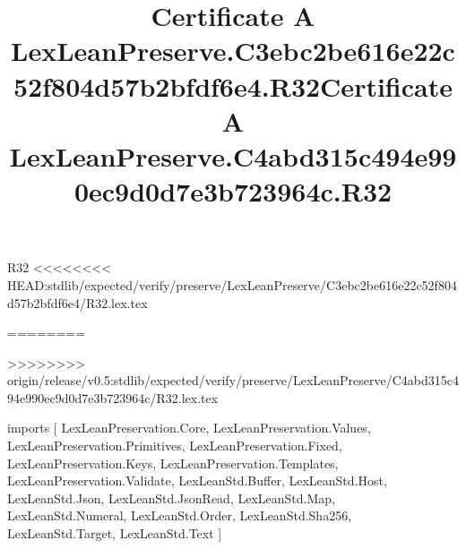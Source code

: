 \begin{lexlean}{R32}
<<<<<<<< HEAD:stdlib/expected/verify/preserve/LexLeanPreserve/C3ebc2be616e22c52f804d57b2bfdf6e4/R32.lex.tex
\title{Certificate A LexLeanPreserve.C3ebc2be616e22c52f804d57b2bfdf6e4.R32}
========
\title{Certificate A LexLeanPreserve.C4abd315c494e990ec9d0d7e3b723964c.R32}
>>>>>>>> origin/release/v0.5:stdlib/expected/verify/preserve/LexLeanPreserve/C4abd315c494e990ec9d0d7e3b723964c/R32.lex.tex
\begin{coremodule}
imports [
  LexLeanPreservation.Core,
  LexLeanPreservation.Values,
  LexLeanPreservation.Primitives,
  LexLeanPreservation.Fixed,
  LexLeanPreservation.Keys,
  LexLeanPreservation.Templates,
  LexLeanPreservation.Validate,
  LexLeanStd.Buffer,
  LexLeanStd.Host,
  LexLeanStd.Json,
  LexLeanStd.JsonRead,
  LexLeanStd.Map,
  LexLeanStd.Numeral,
  LexLeanStd.Order,
  LexLeanStd.Sha256,
  LexLeanStd.Target,
  LexLeanStd.Text
]


\end{coremodule}
\end{lexlean}
